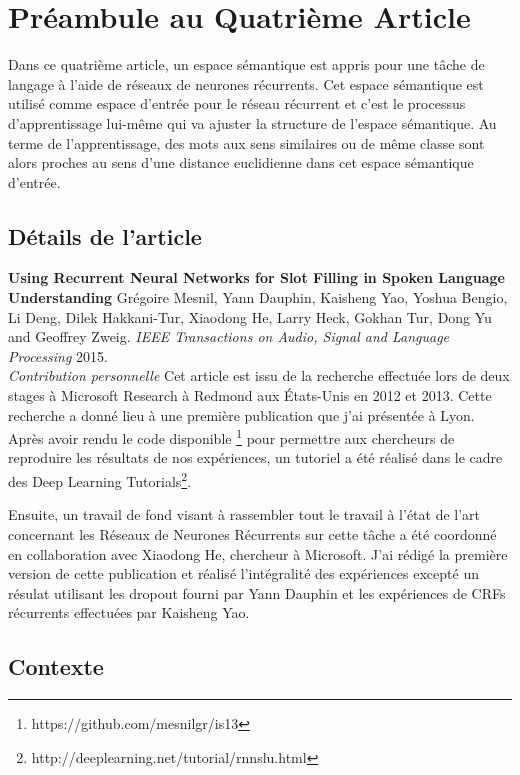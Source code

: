 \chapter{Pr\'{e}ambule au Quatri\`{e}me Article }

Dans ce quatrième article, un espace sémantique est appris pour une tâche de
langage à l'aide de réseaux de neurones récurrents. Cet espace sémantique est
utilisé comme espace d'entrée pour le réseau récurrent et c'est le processus
d'apprentissage lui-même qui va ajuster la structure de l'espace sémantique. Au
terme de l'apprentissage, des mots aux sens similaires ou de même classe sont
alors proches au sens d'une distance euclidienne dans cet espace sémantique d'entrée.


\section{D\'{e}tails de l'article}

{\bf Using Recurrent Neural Networks for Slot Filling in Spoken Language
Understanding} Grégoire Mesnil, Yann Dauphin, Kaisheng Yao, Yoshua Bengio, Li
Deng, Dilek Hakkani-Tur, Xiaodong He, Larry Heck, Gokhan Tur, Dong Yu and
Geoffrey Zweig. {\it IEEE Transactions on Audio, Signal and Language
Processing} 2015. \\

{\it Contribution personnelle} Cet article est issu de la recherche effectuée
lors de deux stages à Microsoft Research à Redmond aux États-Unis en 2012 et
2013. Cette recherche a donné lieu à une première publication
\citep{mesnil-et-al-Interspeech2013} que j'ai présentée à Lyon. Après avoir
rendu le code disponible \footnote{https://github.com/mesnilgr/is13} pour
permettre aux chercheurs de reproduire les résultats de nos expériences, un
tutoriel a été réalisé dans le cadre des Deep Learning
Tutorials\footnote{http://deeplearning.net/tutorial/rnnslu.html}.

Ensuite, un travail de fond visant à rassembler tout le travail à l'état de
l'art concernant les Réseaux de Neurones Récurrents sur cette tâche a été
coordonné en collaboration avec Xiaodong He, chercheur à Microsoft. J'ai rédigé
la première version de cette publication et réalisé l'intégralité des
expériences excepté un résulat utilisant les dropout fourni par Yann Dauphin
et les expériences de CRFs récurrents effectuées par Kaisheng Yao. 

\section{Contexte}

